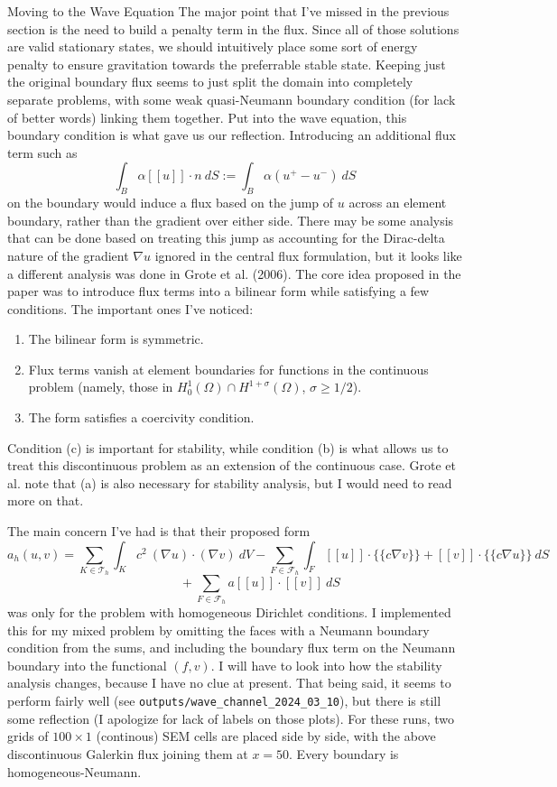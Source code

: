 \documentclass[12pt, letterpaper]{article}
\begin{document}
\begin{section}{Moving to the Wave Equation}
The major point that I've missed in the previous section is the need to build a penalty term in the flux. Since all of those solutions are valid stationary states, we should intuitively place some sort of energy penalty to ensure gravitation towards the preferrable stable state. Keeping just the original boundary flux seems to just split the domain into completely separate problems, with some weak quasi-Neumann boundary condition (for lack of better words) linking them together. Put into the wave equation, this boundary condition is what gave us our reflection. Introducing an additional flux term such as
$$\int_{B}\alpha [[u]]\cdot n~dS := \int_{B}\alpha (u^+ - u^-)~dS$$
on the boundary would induce a flux based on the jump of $u$ across an element boundary, rather than the gradient over either side. There may be some analysis that can be done based on treating this jump as accounting for the Dirac-delta nature of the gradient $\nabla u$ ignored in the central flux formulation, but it looks like a different analysis was done in Grote et al. (2006). The core idea proposed in the paper was to introduce flux terms into a bilinear form while satisfying a few conditions. The important ones I've noticed:
\begin{enumerate}[label=(\alph*)]
	\item The bilinear form is symmetric.
	\item Flux terms vanish at element boundaries for functions in the continuous problem (namely, those in $H_0^1(\Omega) \cap H^{1+\sigma}(\Omega)$, $\sigma \ge 1/2$).
	\item The form satisfies a coercivity condition.
\end{enumerate}
Condition (c) is important for stability, while condition (b) is what allows us to treat this discontinuous problem as an extension of the continuous case. Grote et al. note that (a) is also necessary for stability analysis, but I would need to read more on that.

The main concern I've had is that their proposed form
$$a_h(u,v) = \sum_{K\in \mathcal T_h}\int_K c^2~(\nabla u)\cdot(\nabla v)~dV - \sum_{F\in \mathcal F_h}\int_{F}[[u]]\cdot \{\{c\nabla v\}\} + [[v]]\cdot \{\{c\nabla u\}\}~dS$$$$~~~~~~~~~~~~~~~~~~ + \sum_{F\in \mathcal F_h}a [[u]] \cdot [[v]]~dS$$
was only for the problem with homogeneous Dirichlet conditions. I implemented this for my mixed problem by omitting the faces with a Neumann boundary condition from the sums, and including the boundary flux term on the Neumann boundary into the functional $(f,v)$. I will have to look into how the stability analysis changes, because I have no clue at present. That being said, it seems to perform fairly well (see \verb+outputs/wave_channel_2024_03_10+), but there is still some reflection (I apologize for lack of labels on those plots). For these runs, two grids of $100 \times 1$ (continous) SEM cells are placed side by side, with the above discontinuous Galerkin flux joining them at $x=50$. Every boundary is homogeneous-Neumann.


\end{section}
\end{document}
